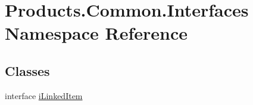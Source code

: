 \hypertarget{namespace_products_1_1_common_1_1_interfaces}{}\section{Products.\+Common.\+Interfaces Namespace Reference}
\label{namespace_products_1_1_common_1_1_interfaces}
\subsection*{Classes}
\begin{DoxyCompactItemize}
\item 
interface \hyperlink{interface_products_1_1_common_1_1_interfaces_1_1i_linked_item}{i\+Linked\+Item}
\end{DoxyCompactItemize}
